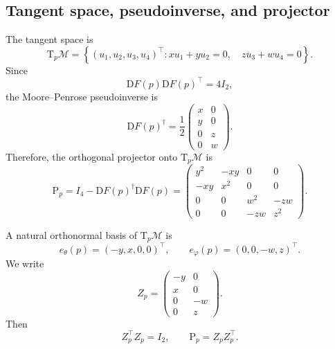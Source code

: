\documentclass[11pt]{article}
\newcommand{\M}{\mathcal{M}}
\newcommand{\T}{\mathrm{T}}
\newcommand{\D}{\mathrm{D}}
\newcommand{\Proj}{\mathrm{P}}
\begin{document}
\subsection*{Tangent space, pseudoinverse, and projector}

The tangent space is
\begin{equation}\label{eq:tangent_product_torus}
    \T_p\M
    =
    \left\{
        (u_1,u_2,u_3,u_4)^\top:
        xu_1+yu_2=0,\quad
        zu_3+wu_4=0
    \right\}.
\end{equation}
Since
\[
    \D F(p)\D F(p)^\top=4I_2,
\]
the Moore--Penrose pseudoinverse is
\begin{equation}\label{eq:pseudoinverse_product_torus}
    \D F(p)^\dagger
    =
    \frac12
    \begin{pmatrix}
        x&0\\
        y&0\\
        0&z\\
        0&w
    \end{pmatrix}.
\end{equation}
Therefore, the orthogonal projector onto $\T_p\M$ is
\begin{equation}\label{eq:projector_product_torus}
    \Proj_p
    =
    I_4-\D F(p)^\dagger\D F(p)
    =
    \begin{pmatrix}
        y^2&-xy&0&0\\
        -xy&x^2&0&0\\
        0&0&w^2&-zw\\
        0&0&-zw&z^2
    \end{pmatrix}.
\end{equation}

A natural orthonormal basis of $\T_p\M$ is
\begin{equation}\label{eq:basis_product_torus}
    e_\theta(p)=(-y,x,0,0)^\top,
    \qquad
    e_\varphi(p)=(0,0,-w,z)^\top.
\end{equation}
We write
\begin{equation}\label{eq:Z_product_torus}
    Z_p
    =
    \begin{pmatrix}
        -y&0\\
        x&0\\
        0&-w\\
        0&z
    \end{pmatrix}.
\end{equation}
Then
\[
    Z_p^\top Z_p=I_2,
    \qquad
    \Proj_p=Z_pZ_p^\top.
\]
\end{document}

